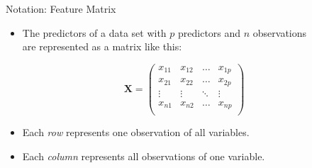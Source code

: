 \documentclass[mathserif, aspectratio=169]{beamer}
\begin{document}
\begin{frame}{Notation: Feature Matrix}
	\begin{itemize}
		\item The predictors of a data set with $p$ predictors and $n$ observations\\
			are represented as a matrix like this:
	\end{itemize}
	\vspace{-8mm}
	\begin{center}
		\[ \bm{X} = 
			\begin{pmatrix}
				x_{11} & x_{12} & \dots & x_{1p} \\ 
				x_{21} & x_{22} & \dots & x_{2p} \\ 
				\vdots & \vdots & \ddots & \vdots \\
				x_{n1} & x_{n2} & \dots & x_{np} \\ 
			\end{pmatrix}
		\]
	\end{center}
	\begin{itemize}
		\item Each \emph{row} represents one observation of all variables.
		\item Each \emph{column} represents all observations of one variable.
	\end{itemize}
\end{frame}
\end{document}
